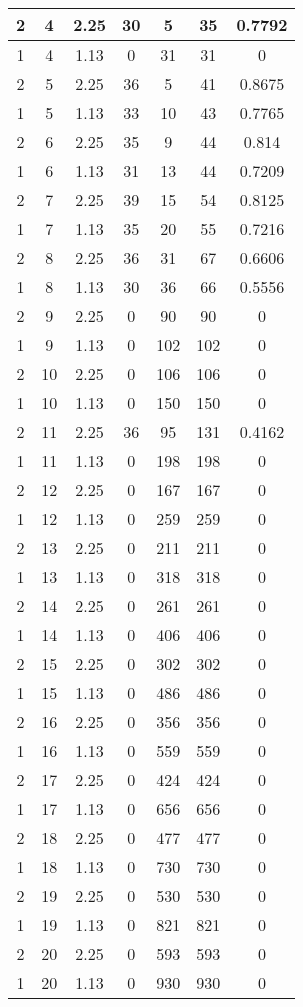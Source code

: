 \documentclass[letterpaper, 12pt]{article}
\begin{document}
\begin{longtable}{|c|c|c|c|c|c|c|}
\hline
2 & 4 & 2.25 & 30 & 5 & 35 & 0.7792 \\
\hline
1 & 4 & 1.13 & 0 & 31 & 31 & 0 \\
\hline
2 & 5 & 2.25 & 36 & 5 & 41 & 0.8675 \\
\hline
1 & 5 & 1.13 & 33 & 10 & 43 & 0.7765 \\
\hline
2 & 6 & 2.25 & 35 & 9 & 44 & 0.814 \\
\hline
1 & 6 & 1.13 & 31 & 13 & 44 & 0.7209 \\
\hline
2 & 7 & 2.25 & 39 & 15 & 54 & 0.8125 \\
\hline
1 & 7 & 1.13 & 35 & 20 & 55 & 0.7216 \\
\hline
2 & 8 & 2.25 & 36 & 31 & 67 & 0.6606 \\
\hline
1 & 8 & 1.13 & 30 & 36 & 66 & 0.5556 \\
\hline
2 & 9 & 2.25 & 0 & 90 & 90 & 0 \\
\hline
1 & 9 & 1.13 & 0 & 102 & 102 & 0 \\
\hline
2 & 10 & 2.25 & 0 & 106 & 106 & 0 \\
\hline
1 & 10 & 1.13 & 0 & 150 & 150 & 0 \\
\hline
2 & 11 & 2.25 & 36 & 95 & 131 & 0.4162 \\
\hline
1 & 11 & 1.13 & 0 & 198 & 198 & 0 \\
\hline
2 & 12 & 2.25 & 0 & 167 & 167 & 0 \\
\hline
1 & 12 & 1.13 & 0 & 259 & 259 & 0 \\
\hline
2 & 13 & 2.25 & 0 & 211 & 211 & 0 \\
\hline
1 & 13 & 1.13 & 0 & 318 & 318 & 0 \\
\hline
2 & 14 & 2.25 & 0 & 261 & 261 & 0 \\
\hline
1 & 14 & 1.13 & 0 & 406 & 406 & 0 \\
\hline
2 & 15 & 2.25 & 0 & 302 & 302 & 0 \\
\hline
1 & 15 & 1.13 & 0 & 486 & 486 & 0 \\
\hline
2 & 16 & 2.25 & 0 & 356 & 356 & 0 \\
\hline
1 & 16 & 1.13 & 0 & 559 & 559 & 0 \\
\hline
2 & 17 & 2.25 & 0 & 424 & 424 & 0 \\
\hline
1 & 17 & 1.13 & 0 & 656 & 656 & 0 \\
\hline
2 & 18 & 2.25 & 0 & 477 & 477 & 0 \\
\hline
1 & 18 & 1.13 & 0 & 730 & 730 & 0 \\
\hline
2 & 19 & 2.25 & 0 & 530 & 530 & 0 \\
\hline
1 & 19 & 1.13 & 0 & 821 & 821 & 0 \\
\hline
2 & 20 & 2.25 & 0 & 593 & 593 & 0 \\
\hline
1 & 20 & 1.13 & 0 & 930 & 930 & 0 \\
\hline
\end{longtable}
\end{document}
